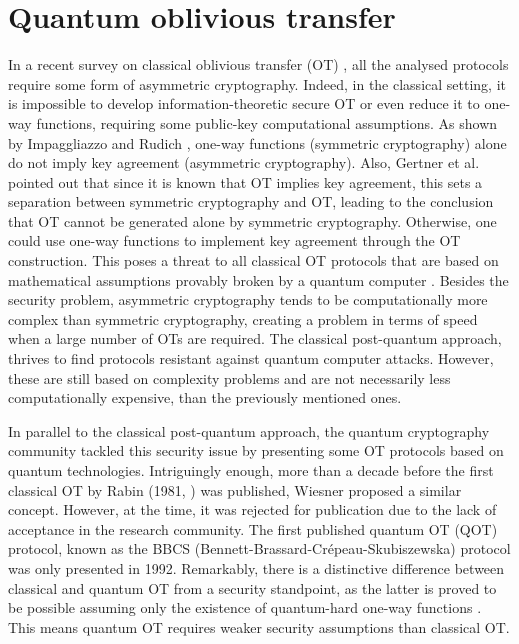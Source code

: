 


%

\chapter{Quantum oblivious transfer}\label{chapter_QOT}


In a recent survey on classical oblivious transfer (OT) \cite{YAVV22}, all the analysed protocols require some form of asymmetric cryptography. Indeed, in the classical setting, it is impossible to develop information-theoretic secure OT or even reduce it to one-way functions, requiring some public-key computational assumptions. As shown by Impaggliazzo and Rudich \cite{IR89}, one-way functions (symmetric cryptography) alone do not imply key agreement (asymmetric cryptography). Also, Gertner et al. \cite{GKMRV00} pointed out that since it is known that OT implies key agreement, this sets a separation between symmetric cryptography and OT, leading to the conclusion that OT cannot be generated alone by symmetric cryptography. Otherwise, one could use one-way functions to implement key agreement through the OT construction. This poses a threat to all classical OT protocols \cite{EGL85, NP01, CO15} that are based on mathematical assumptions provably broken by a quantum computer \cite{Sho95}. Besides the security problem, asymmetric cryptography tends to be computationally more complex than symmetric cryptography, creating a problem in terms of speed when a large number of OTs are required. The classical post-quantum approach, thrives to find protocols resistant against quantum computer attacks. However, these are still based on complexity problems and are not necessarily less computationally expensive, than the previously mentioned ones. 

In parallel to the classical post-quantum approach, the quantum cryptography community tackled this security issue by presenting some OT protocols based on quantum technologies. Intriguingly enough, more than a decade before the first classical OT by Rabin (1981, \cite{Rabin81}) was published, Wiesner proposed a similar concept. However, at the time, it was rejected for publication due to the lack of acceptance in the research community. The first published quantum OT (QOT) protocol, known as the BBCS (Bennett-Brassard-Cr{\'e}peau-Skubiszewska) protocol \cite{BBCS92} was only presented in 1992. Remarkably, there is a distinctive difference between classical and quantum OT from a security standpoint, as the latter is proved to be possible assuming only the existence of quantum-hard one-way functions \cite{GLSV21, BCKM21}. This means quantum OT requires weaker security assumptions than classical OT.


